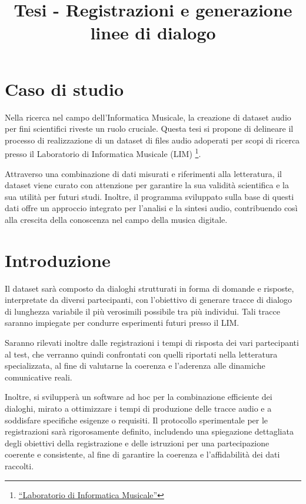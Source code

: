 \documentclass[
]{article}
\title{Tesi - Registrazioni e generazione linee di dialogo}
\author{}
\date{}
\begin{document}
\maketitle

{
\setcounter{tocdepth}{2}
\tableofcontents
}
\section{Caso di studio}\label{caso-di-studio}

Nella ricerca nel campo dell'Informatica Musicale, la creazione di dataset audio per fini scientifici riveste un ruolo cruciale. Questa tesi si propone di delineare il processo di realizzazione di un dataset di files audio adoperati per scopi di ricerca presso il Laboratorio di Informatica Musicale (LIM) \footnote{\href{https://www.lim.di.unimi.it/}{``Laboratorio di Informatica Musicale''}}.

Attraverso una combinazione di dati misurati e riferimenti alla letteratura, il dataset viene curato con attenzione per garantire la sua validità scientifica e la sua utilità per futuri studi. Inoltre, il programma sviluppato sulla base di questi dati offre un approccio integrato per l'analisi e la sintesi audio, contribuendo così alla crescita della conoscenza nel campo della musica digitale.

\section{Introduzione}\label{introduzione}

Il dataset sarà composto da dialoghi strutturati in forma di domande e risposte, interpretate da diversi partecipanti, con l'obiettivo di generare tracce di dialogo di lunghezza variabile il più verosimili possibile tra più individui. Tali tracce saranno impiegate per condurre esperimenti futuri presso il LIM.

Saranno rilevati inoltre dalle registrazioni i tempi di risposta dei vari partecipanti al test, che verranno quindi confrontati con quelli riportati nella letteratura specializzata, al fine di valutarne la coerenza e l'aderenza alle dinamiche comunicative reali.

Inoltre, si svilupperà un software ad hoc per la combinazione efficiente dei dialoghi, mirato a ottimizzare i tempi di produzione delle tracce audio e a soddisfare specifiche esigenze o requisiti. Il protocollo sperimentale per le registrazioni sarà rigorosamente definito, includendo una spiegazione dettagliata degli obiettivi della registrazione e delle istruzioni per una partecipazione coerente e consistente, al fine di garantire la coerenza e l'affidabilità dei dati raccolti.
\end{document}

